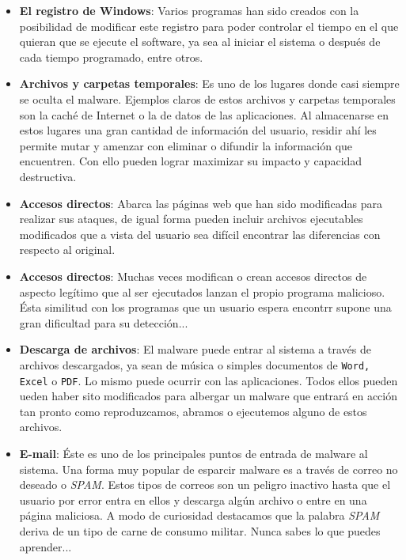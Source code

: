 \documentclass[12pt]{article}
\begin{document}
            \begin{itemize}
                \item \textbf{El registro de Windows}: Varios programas han sido creados con la posibilidad de modificar este registro para poder controlar el tiempo en el que quieran que se ejecute el software, ya sea al iniciar el sistema o después de cada tiempo programado, entre otros.
                \item \textbf{Archivos y carpetas temporales}: Es uno de los lugares donde casi siempre se oculta el malware. Ejemplos claros de estos archivos y carpetas temporales son la caché de Internet o la de datos de las aplicaciones. Al almacenarse en estos lugares una gran cantidad de información del usuario, residir ahí les permite mutar y amenzar con eliminar o difundir la información que encuentren. Con ello pueden lograr maximizar su impacto y capacidad destructiva.
                \item \textbf{Accesos directos}: Abarca las páginas web que han sido modificadas para realizar sus ataques, de igual forma pueden incluir archivos ejecutables modificados que a vista del usuario sea difícil encontrar las diferencias con respecto al original.
                \item \textbf{Accesos directos}: Muchas veces modifican o crean accesos directos de aspecto legítimo que al ser ejecutados lanzan el propio programa malicioso. Ésta similitud con los programas que un usuario espera encontrr supone una gran dificultad para su detección...
                \item \textbf{Descarga de archivos}: El malware puede entrar al sistema a través de archivos descargados, ya sean de música o simples documentos de \texttt{Word, Excel} o \texttt{PDF}. Lo mismo puede ocurrir con las aplicaciones. Todos ellos pueden ueden haber sito modificados para albergar un malware que entrará en acción tan pronto como reproduzcamos, abramos o ejecutemos alguno de estos archivos.
                \item \textbf{E-mail}: Éste es uno de los principales puntos de entrada de malware al sistema. Una forma muy popular de esparcir malware es a través de correo no deseado o \textit{SPAM}. Estos tipos de correos son un peligro inactivo hasta que el usuario por error entra en ellos y descarga algún archivo o entre en una página maliciosa. A modo de curiosidad destacamos que la palabra \textit{SPAM} deriva de un tipo de carne de consumo militar. Nunca sabes lo que puedes aprender...
            \end{itemize}
\end{document}
